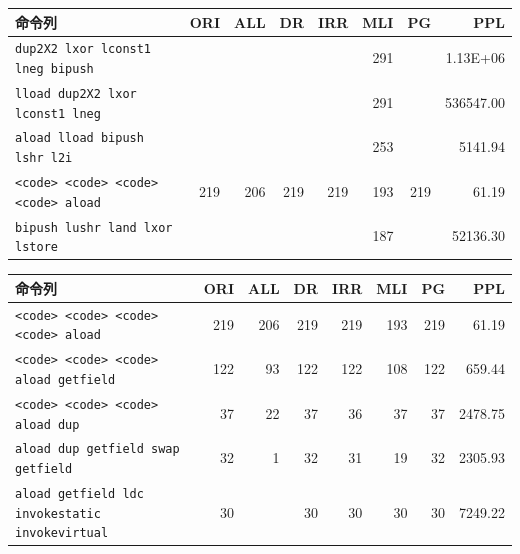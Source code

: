 \documentclass[12pt,twoside]{jreport}
\begin{document}
\begin{table}[t]
{  \begin{tabular}{lrrrrrrr}
   命令列 &
    \multicolumn{1}{p{1cm}}{ORI} & 
    \multicolumn{1}{p{1cm}}{ALL} & 
    \multicolumn{1}{p{1cm}}{DR} & 
    \multicolumn{1}{p{1cm}}{IRR} & 
    \multicolumn{1}{p{1cm}}{MLI} & 
    \multicolumn{1}{p{1cm}}{PG} & 
    \multicolumn{1}{p{1cm}}{PPL} \\ \hline
    \texttt{dup2X2 lxor lconst1 lneg bipush}   &     &     &     &     & 291 &     & 1.13E+06 \\
    \texttt{lload dup2X2 lxor lconst1 lneg}    &     &     &     &     & 291 &     & 536547.00 \\
    \texttt{aload lload bipush lshr l2i}       &     &     &     &     & 253 &     & 5141.94 \\
    \texttt{<code> <code> <code> <code> aload} & 219 & 206 & 219 & 219 & 193 & 219 & 61.19 \\
    \texttt{bipush lushr land lxor lstore}     &     &     &     &     & 187 &     & 52136.30 \\
  \end{tabular}
  
  \begin{tabular}{lrrrrrrr}
   命令列 &
    \multicolumn{1}{p{1cm}}{ORI} & 
    \multicolumn{1}{p{1cm}}{ALL} & 
    \multicolumn{1}{p{1cm}}{DR} & 
    \multicolumn{1}{p{1cm}}{IRR} & 
    \multicolumn{1}{p{1cm}}{MLI} & 
    \multicolumn{1}{p{1cm}}{PG} & 
    \multicolumn{1}{p{1cm}}{PPL} \\ \hline
   \texttt{<code> <code> <code> <code> aload}              & 219 & 206 & 219 & 219 & 193 & 219 & 61.19 \\
    \texttt{<code> <code> <code> aload getfield}           & 122 &  93 & 122 & 122 & 108 & 122 & 659.44 \\
    \texttt{<code> <code> <code> aload dup}                & 37  &  22 &  37 &  36 &  37 &  37 & 2478.75 \\
    \texttt{aload dup getfield swap getfield}              & 32  &   1 &  32 &  31 &  19 &  32 & 2305.93 \\
    \texttt{aload getfield ldc invokestatic invokevirtual} & 30  &     &  30 &  30 &  30 &  30 & 7249.22 \\  \end{tabular}}
\end{table}
\end{document}
